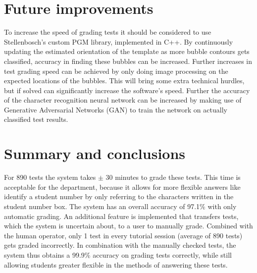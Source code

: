 \section{Future improvements}

To increase the speed of grading tests it should be considered to use Stellenbosch's custom PGM library, implemented in C++. By continuously updating the estimated orientation of the template as more bubble contours gets classified, accuracy in finding these bubbles can be increased. Further increases in test grading speed can be achieved by only doing image processing on the expected locations of the bubbles. This will bring some extra technical hurdles, but if solved can significantly increase the software's speed. Further the accuracy of the character recognition neural network can be increased by making use of Generative Adversarial Networks (GAN) to train the network on actually classified test results.

\section{Summary and conclusions}
For 890 tests the system takes $\pm$ 30 minutes to grade these tests. This time is acceptable for the department, because it allows for more flexible answers like identify a student number by only referring to the characters written in the student number box. The system has an overall accuracy of 97.1\% with only automatic grading. An additional feature is implemented that transfers tests, which the system is uncertain about, to a user to manually grade. Combined with the human operator, only 1 test in every tutorial session (average of 890 tests) gets graded incorrectly. In combination with the manually checked tests, the system thus obtains a 99.9\% accuracy on grading tests correctly, while still allowing students greater flexible in the methods of answering these tests.